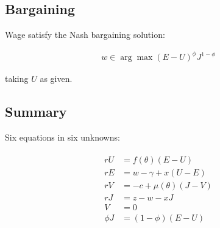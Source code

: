 \documentclass[10pt]{article}
\begin{document}
\subsection{Bargaining}

Wage satisfy the Nash bargaining solution:

\begin{align}
    w \in \arg \max (E-U)^\phi J^{1-\phi}
\end{align}

taking $U$ as given.

\subsection{Summary}

Six equations in six unknowns:

\begin{align}
    \begin{aligned}
        r U & =f(\theta)(E-U) \\
        r E & =w-\gamma+x(U-E) \\
        r V & =-c+\mu(\theta)(J-V) \\
        r J & =z-w-x J \\
        V & =0 \\
        \phi J & =(1-\phi)(E-U)
        \end{aligned}
\end{align}
\end{document}
